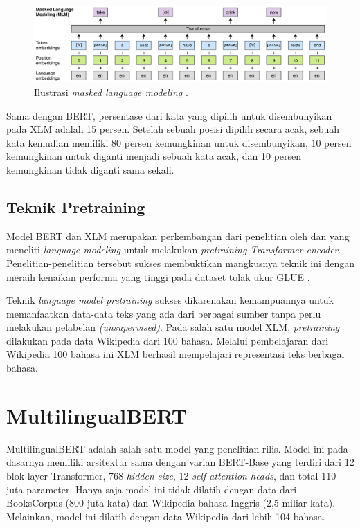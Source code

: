     \begin{figure}[ht]
        \centering
        \includegraphics[width=1\textwidth]{resources/ilustrasi-mlm.png}
        \caption{Ilustrasi \textit{masked language modeling} \parencite{LampleConneau2019}.}
        \label{fig:ilustrasi_mlm}
    \end{figure}

    Sama dengan BERT, persentase dari kata yang dipilih untuk disembunyikan pada XLM adalah 15 persen. Setelah sebuah posisi dipilih secara acak, sebuah kata kemudian memiliki 80 persen kemungkinan untuk disembunyikan, 10 persen kemungkinan untuk diganti menjadi sebuah kata acak, dan 10 persen kemungkinan tidak diganti sama sekali.

    \subsection{Teknik Pretraining}
    Model BERT dan XLM merupakan perkembangan dari penelitian oleh \parencite{radford2018improving} dan \parencite{HowardRuder2018} yang meneliti \textit{language modeling} untuk melakukan \textit{pretraining Transformer encoder}. Penelitian-penelitian tersebut sukses membuktikan mangkusnya teknik ini dengan meraih kenaikan performa yang tinggi pada dataset tolak ukur GLUE \parencite{GLUE2019}.

    Teknik \textit{language model pretraining} sukses dikarenakan kemampuannya untuk memanfaatkan data-data teks yang ada dari berbagai sumber tanpa perlu melakukan pelabelan \textit{(unsupervised)}. Pada salah satu model XLM, \textit{pretraining} dilakukan pada data Wikipedia dari 100 bahasa. Melalui pembelajaran dari Wikipedia 100 bahasa ini XLM berhasil mempelajari representasi teks berbagai bahasa.

\section{MultilingualBERT}
    MultilingualBERT adalah salah satu model yang penelitian \parencite{Devlin_Chang_Lee_Toutanova_2019} rilis. Model ini pada dasarnya memiliki arsitektur sama dengan varian BERT-Base yang terdiri dari 12 blok layer Transformer, 768 \textit{hidden size}, 12 \textit{self-attention heads}, dan total 110 juta parameter. Hanya saja model ini tidak dilatih dengan data dari BooksCorpus (800 juta kata) dan Wikipedia bahasa Inggris (2,5 miliar kata). Melainkan, model ini dilatih dengan data Wikipedia dari lebih 104 bahasa.
    
